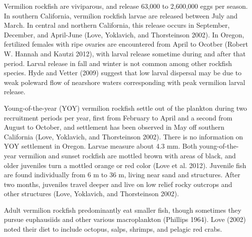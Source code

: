 \documentclass[11pt,
  english,
  a4paper,
]{article}
\begin{document}
Vermilion rockfish are viviparous, and release 63,000 to 2,600,000 eggs per season. In southern California, vermilion rockfish larvae are released between July and March. In central and northern California, this release occurs in September, December, and April-June {(Love, Yoklavich, and Thorsteinson 2002)\leavevmode\tagmcend\tagstructend}. In Oregon, fertilized females with ripe ovaries are encountered from April to Ocotber {(Robert W. Hannah and Kautzi 2012)\leavevmode\tagmcend\tagstructend}, with larval release sometime during and after that period. Larval release in fall and winter is not common among other rockfish species. Hyde and Vetter {(2009)\leavevmode\tagmcend\tagstructend} suggest that low larval dispersal may be due to weak poleward flow of nearshore waters corresponding with peak vermilion larval release.

\leavevmode\tagmcend\tagstructend\par


Young-of-the-year (YOY) vermilion rockfish settle out of the plankton during two recruitment periods per year, first from February to April and a second from August to October, and settlement has been observed in May off southern California {(Love, Yoklavich, and Thorsteinson 2002)\leavevmode\tagmcend\tagstructend}. There is no information on YOY settlement in Oregon. Larvae measure about 4.3 mm. Both young-of-the-year vermilion and sunset rockfish are mottled brown with areas of black, and older juveniles turn a mottled orange or red color {(Love et al. 2012)\leavevmode\tagmcend\tagstructend}. Juvenile fish are found individually from 6 m to 36 m, living near sand and structures. After two months, juveniles travel deeper and live on low relief rocky outcrops and other structures {(Love, Yoklavich, and Thorsteinson 2002)\leavevmode\tagmcend\tagstructend}.

\leavevmode\tagmcend\tagstructend\par


Adult vermilion rockfish predominantly eat smaller fish, though sometimes they pursue euphausiids and other various macroplankton {(Phillips 1964)\leavevmode\tagmcend\tagstructend}. Love {(2002)\leavevmode\tagmcend\tagstructend} noted their diet to include octopus, salps, shrimps, and pelagic red crabs.
\end{document}
